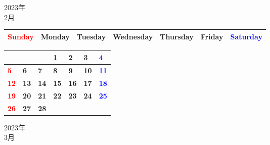 \documentclass[a4paper,landscape]{jsarticle}
\newcommand{\dig}{\hspace{29mm}}
\newcommand{\tdig}{\hspace{27mm}}
\newcommand{\LBF}{\LARGE\textbf}
\begin{document}
\begin{center}
	\LARGE 2023年\\
	\LARGE 2月
\end{center}

\begingroup
\renewcommand{\arraystretch}{1.4}
\begin{tabular}{|>{\centering\arraybackslash}p{32mm}|>{\centering\arraybackslash}p{32mm}|>{\centering\arraybackslash}p{32mm}|>{\centering\arraybackslash}p{32mm}|>{\centering\arraybackslash}p{32mm}|>{\centering\arraybackslash}p{32mm}|>{\centering\arraybackslash}p{32mm}|}
\hline
\textcolor{red}{\large Sunday}&\large Monday&\large Tuesday&\large Wednesday&\large Thursday&\large Friday&\textcolor{blue}{\large Saturday}\\
\hline
\end{tabular}
\endgroup

\begingroup
\renewcommand{\arraystretch}{4}
\begin{tabular}{|p{32mm}|p{32mm}|p{32mm}|p{32mm}|p{32mm}|p{32mm}|p{32mm}|}
\hline
&&&\raisebox{30pt} {\dig\LBF{1}}&\raisebox{30pt} {\dig\LBF{2}}&\raisebox{30pt} {\dig\LBF{3}}&\raisebox{30pt} {\dig\textcolor{blue}{\LBF{4}}}\\
\hline
\raisebox{30pt} {\dig\textcolor{red}{\LBF{5}}}&\raisebox{30pt} {\dig\LBF{6}}&\raisebox{30pt} {\dig\LBF{7}}&\raisebox{30pt} {\dig\LBF{8}}&\raisebox{30pt} {\dig\LBF{9}}&\raisebox{30pt} {\tdig\LBF{10}}&\raisebox{30pt} {\tdig\textcolor{blue}{\LBF{11}}}\\
\hline
\raisebox{30pt} {\tdig\textcolor{red}{\LBF{12}}}&\raisebox{30pt} {\tdig\LBF{13}}&\raisebox{30pt} {\tdig\LBF{14}}&\raisebox{30pt} {\tdig\LBF{15}}&\raisebox{30pt} {\tdig\LBF{16}}&\raisebox{30pt} {\tdig\LBF{17}}&\raisebox{30pt} {\tdig\textcolor{blue}{\LBF{18}}}\\
\hline
\raisebox{30pt} {\tdig\textcolor{red}{\LBF{19}}}&\raisebox{30pt} {\tdig\LBF{20}}&\raisebox{30pt} {\tdig\LBF{21}}&\raisebox{30pt} {\tdig\LBF{22}}&\raisebox{30pt} {\tdig\LBF{23}}&\raisebox{30pt} {\tdig\LBF{24}}&\raisebox{30pt} {\tdig\textcolor{blue}{\LBF{25}}}\\
\hline
\raisebox{30pt} {\tdig\textcolor{red}{\LBF{26}}}&\raisebox{30pt} {\tdig\LBF{27}}&\raisebox{30pt} {\tdig\LBF{28}}&&&&\\
\hline
\end{tabular}
\endgroup

\newpage

\begin{center}
	\LARGE 2023年\\
	\LARGE 3月
\end{center}
\end{document}
